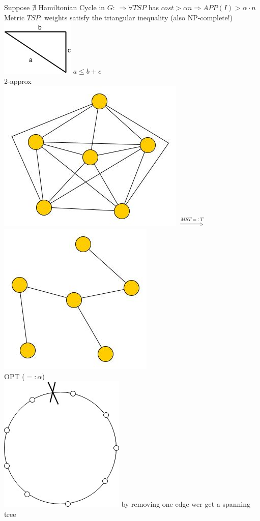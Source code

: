 Suppose $\nexists$ Hamiltonian Cycle in $G$: $\Rightarrow \forall TSP$ has $cost > \alpha n\Rightarrow APP(I) > \alpha \cdot n$ \\
Metric $TSP$: weights satisfy the triangular inequality (also NP-complete!) \\
\includegraphics[scale=0.5]{img/tri} $a \leq b + c$ \\
2-approx \\
\includegraphics[scale=0.5]{img/graph31} $\stackrel{MST =: T}{\Rightarrow}$ \includegraphics[scale=0.5]{img/graph32} \\
OPT ($=: \alpha$) \\
\includegraphics[scale=0.5]{img/st} by removing one edge wer get a spanning tree \\
